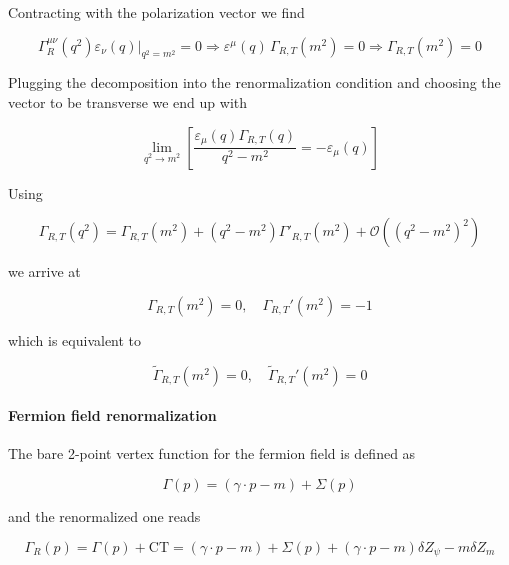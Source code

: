 \documentclass[../FeynCalcManual.tex]{subfiles}
\begin{document}
Contracting with the polarization vector we find

\begin{equation}
     \Gamma_R^{\mu \nu} (q^2)  \varepsilon_\nu (q) \biggl |_{q^2=m^2}  = 0 \Rightarrow \varepsilon^\mu (q) \, \Gamma_{R,T} (m^2) = 0 \Rightarrow \Gamma_{R,T} (m^2) = 0
\end{equation}

Plugging the decomposition into the renormalization condition and
choosing the vector to be transverse we end up with

\begin{equation}
        \lim_{q^2 \to m^2} \left [ \frac{\varepsilon_{\mu}(q) \Gamma_{R,T} (q)}{q^2 -m ^2}  = - \varepsilon_{\mu}(q) \right ]
\end{equation}

Using

\begin{equation}
    \Gamma_{R,T} (q^2) =  \Gamma_{R,T} (m^2) + (q^2 - m^2) \Gamma'_{R,T} (m^2) + \mathcal{O}( (q^2 - m^2)^2)
\end{equation}

we arrive at

\begin{equation}
    \Gamma_{R,T}(m^2) = 0, \quad \Gamma_{R,T}'(m^2) = -1
\end{equation}

which is equivalent to

\begin{equation}
    \tilde{\Gamma}_{R,T}(m^2) = 0, \quad \tilde{\Gamma}_{R,T}'(m^2) = 0
\end{equation}

\hypertarget{fermion-field-renormalization}{%
\paragraph{Fermion field
renormalization}\label{fermion-field-renormalization}}

The bare 2-point vertex function for the fermion field is defined as

\begin{equation}
    \Gamma(p) = (\gamma \cdot p - m) + \Sigma(p)
\end{equation}

and the renormalized one reads

\begin{equation}
    \Gamma_R(p) = \Gamma(p) + \textrm{CT} =  (\gamma \cdot p - m)  + \Sigma(p) + (\gamma \cdot p - m) \delta Z_{\psi} - m  \delta Z_{m} 
\end{equation}
\end{document}
